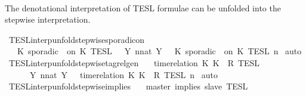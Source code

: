 \begin{isabellebody}
\ \ {\isacartoucheclose}%
\begin{isamarkuptext}%
The denotational interpretation of TESL formulae can be unfolded into the 
  stepwise interpretation.%
\end{isamarkuptext}\isamarkuptrue%
\isamarkupfalse%
\ TESL{\isacharunderscore}interp{\isacharunderscore}unfold{\isacharunderscore}stepwise{\isacharunderscore}sporadicon{\isacharcolon}\isanewline
\ \ {\isacartoucheopen}{\isasymlbrakk}\ K\ sporadic\ {\isasymtau}\ on\ K\ {\isasymrbrakk}\isactrlsub T\isactrlsub E\isactrlsub S\isactrlsub L\ {\isacharequal}\ {\isasymUnion}\ {\isacharbraceleft}Y{\isachardot}\ {\isasymexists}n{\isacharcolon}{\isacharcolon}nat{\isachardot}\ Y\ {\isacharequal}\ {\isasymlbrakk}\ K\ sporadic\ {\isasymtau}\ on\ K\ {\isasymrbrakk}\isactrlsub T\isactrlsub E\isactrlsub S\isactrlsub L\isactrlbsup {\isasymge}\ n\isactrlesup {\isacharbraceright}{\isacartoucheclose}\isanewline
%
\isadelimproof
%
\endisadelimproof
%
\isatagproof
{}\isamarkupfalse%
\ auto%
\endisatagproof
{\isafoldproof}%
%
\isadelimproof
\isanewline
%
\endisadelimproof
\isanewline
{}\isamarkupfalse%
\ TESL{\isacharunderscore}interp{\isacharunderscore}unfold{\isacharunderscore}stepwise{\isacharunderscore}tagrelgen{\isacharcolon}\isanewline
\ \ {\isacartoucheopen}{\isasymlbrakk}\ time{\isacharminus}relation\ {\isasymlfloor}K\ K\ {\isasymin}\ R\ {\isasymrbrakk}\isactrlsub T\isactrlsub E\isactrlsub S\isactrlsub L\isanewline
\ \ \ \ {\isacharequal}\ {\isasymInter}\ {\isacharbraceleft}Y{\isachardot}\ {\isasymexists}n{\isacharcolon}{\isacharcolon}nat{\isachardot}\ Y\ {\isacharequal}\ {\isasymlbrakk}\ time{\isacharminus}relation\ {\isasymlfloor}K\ K\ {\isasymin}\ R\ {\isasymrbrakk}\isactrlsub T\isactrlsub E\isactrlsub S\isactrlsub L\isactrlbsup {\isasymge}\ n\isactrlesup {\isacharbraceright}{\isacartoucheclose}\isanewline
%
\isadelimproof
%
\endisadelimproof
%
\isatagproof
{}\isamarkupfalse%
\ auto%
\endisatagproof
{\isafoldproof}%
%
\isadelimproof
\isanewline
%
\endisadelimproof
\isanewline
{}\isamarkupfalse%
\ TESL{\isacharunderscore}interp{\isacharunderscore}unfold{\isacharunderscore}stepwise{\isacharunderscore}implies{\isacharcolon}\isanewline
\ \ {\isacartoucheopen}{\isasymlbrakk}\ master\ implies\ slave\ {\isasymrbrakk}\isactrlsub T\isactrlsub E\isactrlsub S\isactrlsub L\isanewline

\end{isabellebody}

